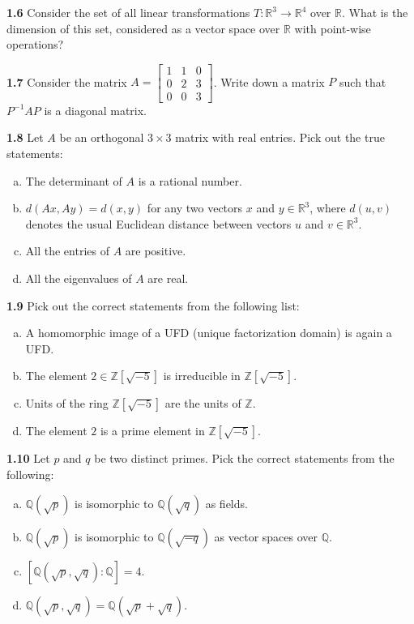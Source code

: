 \documentclass[11pt,a4paper]{article}
\newcommand{\Z}{\mathbb{Z}}
\newcommand{\Q}{\mathbb{Q}}
\newcommand{\R}{\mathbb{R}}
\newcommand{\qitem}[1]{\par\medskip\noindent\textbf{#1}\hspace{0.5em}}
\begin{document}
\qitem{1.6} Consider the set of all linear transformations $T : \R^3 \to \R^4$ over $\R$. What is the dimension of this set, considered as a vector space over $\R$ with point-wise operations?

\qitem{1.7} Consider the matrix $A = \begin{bmatrix} 1 & 1 & 0 \\ 0 & 2 & 3 \\ 0 & 0 & 3 \end{bmatrix}$. Write down a matrix $P$ such that $P^{-1}AP$ is a diagonal matrix.

\qitem{1.8} Let $A$ be an orthogonal $3 \times 3$ matrix with real entries. Pick out the true statements:
\begin{enumerate}[a.]
  \item The determinant of $A$ is a rational number.
  \item $d(Ax, Ay) = d(x, y)$ for any two vectors $x$ and $y \in \R^3$, where $d(u, v)$ denotes the usual Euclidean distance between vectors $u$ and $v \in \R^3$.
  \item All the entries of $A$ are positive.
  \item All the eigenvalues of $A$ are real.
\end{enumerate}

\qitem{1.9} Pick out the correct statements from the following list:
\begin{enumerate}[a.]
  \item A homomorphic image of a UFD (unique factorization domain) is again a UFD.
  \item The element $2 \in \Z[\sqrt{-5}]$ is irreducible in $\Z[\sqrt{-5}]$.
  \item Units of the ring $\Z[\sqrt{-5}]$ are the units of $\Z$.
  \item The element $2$ is a prime element in $\Z[\sqrt{-5}]$.
\end{enumerate}

\qitem{1.10} Let $p$ and $q$ be two distinct primes. Pick the correct statements from the following:
\begin{enumerate}[a.]
  \item $\Q(\sqrt{p})$ is isomorphic to $\Q(\sqrt{q})$ as fields.
  \item $\Q(\sqrt{p})$ is isomorphic to $\Q(\sqrt{-q})$ as vector spaces over $\Q$.
  \item $[\Q(\sqrt{p}, \sqrt{q}) : \Q] = 4$.
  \item $\Q(\sqrt{p}, \sqrt{q}) = \Q(\sqrt{p} + \sqrt{q})$.
\end{enumerate}
\end{document}
